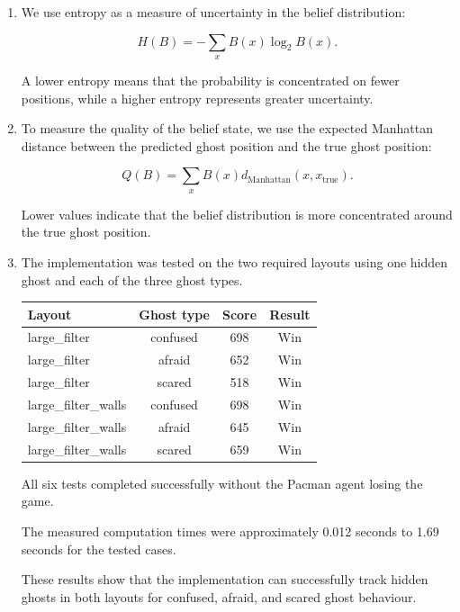 \documentclass{article}
\begin{document}
\begin{enumerate}[label=\alph*.,leftmargin=*]

    \item
    We use entropy as a measure of uncertainty in the belief distribution:

    \[
    H(B)
    =
    -\sum_x B(x)\log_2 B(x).
    \]

    A lower entropy means that the probability is concentrated on fewer
    positions, while a higher entropy represents greater uncertainty.

    \item
    To measure the quality of the belief state, we use the expected
    Manhattan distance between the predicted ghost position and the true
    ghost position:

    \[
    Q(B)
    =
    \sum_x
    B(x)
    d_{\mathrm{Manhattan}}(x,x_{\mathrm{true}}).
    \]

    Lower values indicate that the belief distribution is more concentrated
    around the true ghost position.

    \item
    The implementation was tested on the two required layouts using one
    hidden ghost and each of the three ghost types.

    \begin{center}
    \begin{tabular}{lccc}
    \hline
    Layout & Ghost type & Score & Result \\
    \hline
    large\_filter & confused & 698 & Win \\
    large\_filter & afraid & 652 & Win \\
    large\_filter & scared & 518 & Win \\
    large\_filter\_walls & confused & 698 & Win \\
    large\_filter\_walls & afraid & 645 & Win \\
    large\_filter\_walls & scared & 659 & Win \\
    \hline
    \end{tabular}
    \end{center}

    All six tests completed successfully without the Pacman agent losing
    the game.

    The measured computation times were approximately 0.012 seconds to
    1.69 seconds for the tested cases.

    These results show that the implementation can successfully track hidden
    ghosts in both layouts for confused, afraid, and scared ghost behaviour.


\end{enumerate}
\end{document}
